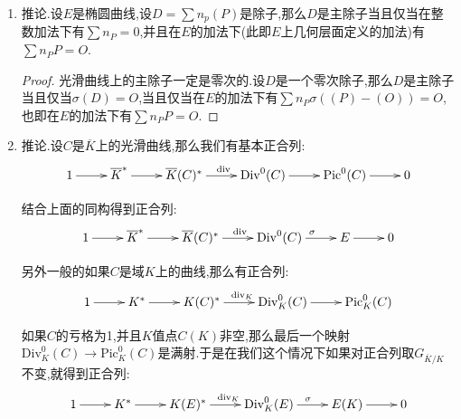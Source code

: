 \begin{enumerate}
\begin{enumerate}
\begin{proof}
			设椭圆曲线$E$被一个Weierstrass方程定义,我们需要证明的是对$P,Q\in E$,有$\kappa(P+Q)=\kappa(P)+\kappa(Q)$.设$\mathbb{P}^2_{\overline{K}}$中的直线$L:f(X,Y,Z)=\alpha X+\beta Y+\gamma Z$是$P$和$Q$定义的直线.设第三个交点为$R$.再设$R$和$O$确定的直线为$L':f'(X,Y,Z)=\alpha' X+\beta' Y+\gamma' Z$.再按照$Z=0$和$E$的交点是重数为3的$O$,所以有:
			$$\mathrm{div}(f/Z)=(P)+(Q)+(R)-3(O)$$
			$$\mathrm{div}(f'/Z)=(R)+(P+Q)-2(O)$$
			
			于是我们有$(P+Q)-(P)-(Q)+(O)=\mathrm{div}(f'/f)$是主除子,另外明显有$\kappa(O)$是主除子类.于是有$\kappa(P+Q)=\kappa(P)+\kappa(Q)$.
		\end{proof}
	\end{enumerate}
	\item 推论.设$E$是椭圆曲线,设$D=\sum n_p(P)$是除子,那么$D$是主除子当且仅当在整数加法下有$\sum n_P=0$,并且在$E$的加法下(此即$E$上几何层面定义的加法)有$\sum n_PP=O$.
	\begin{proof}
		
		光滑曲线上的主除子一定是零次的.设$D$是一个零次除子,那么$D$是主除子当且仅当$\sigma(D)=O$,当且仅当在$E$的加法下有$\sum n_P\sigma((P)-(O))=O$,也即在$E$的加法下有$\sum n_PP=O$.
	\end{proof}
	\item 推论.设$C$是$\overline{K}$上的光滑曲线,那么我们有基本正合列:
	$$\xymatrix{1\ar[r]&\overline{K}^*\ar[r]&\overline{K}(C)^*\ar[r]^{\mathrm{div}}&\mathrm{Div}^0(C)\ar[r]&\mathrm{Pic}^0(C)\ar[r]&0}$$
	
	结合上面的同构得到正合列:
	$$\xymatrix{1\ar[r]&\overline{K}^*\ar[r]&\overline{K}(C)^*\ar[r]^{\mathrm{div}}&\mathrm{Div}^0(C)\ar[r]^{\sigma}&E\ar[r]&0}$$
	
	另外一般的如果$C$是域$K$上的曲线,那么有正合列:
	$$\xymatrix{1\ar[r]&K^*\ar[r]&K(C)^*\ar[r]^{\mathrm{div}_K}&\mathrm{Div}_K^0(C)\ar[r]&\mathrm{Pic}_K^0(C)}$$
	
	如果$C$的亏格为1,并且$K$值点$C(K)$非空,那么最后一个映射$\mathrm{Div}_K^0(C)\to\mathrm{Pic}_K^0(C)$是满射.于是在我们这个情况下如果对正合列取$G_{\overline{K}/K}$不变,就得到正合列:
	$$\xymatrix{1\ar[r]&K^*\ar[r]&K(E)^*\ar[r]^{\mathrm{div}_K}&\mathrm{Div}_K^0(E)\ar[r]^{\sigma}&E(K)\ar[r]&0}$$
\end{enumerate}

